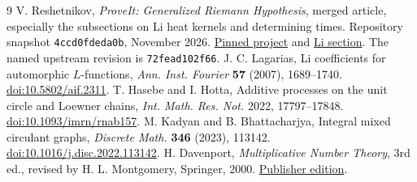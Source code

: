 \documentclass[11pt,letterpaper]{article}
\begin{document}
\begingroup\small
\begin{thebibliography}{9}
V. Reshetnikov, \emph{ProveIt: Generalized Riemann Hypothesis}, merged article, especially the subsections on Li heat kernels and determining times. Repository snapshot \texttt{4ccd0fdeda0b}, November 2026.
\href{https://github.com/VladimirReshetnikov/ProveIt/tree/4ccd0fdeda0b1cc316d2dfdccfdbcfea9d4b77fb/Analysis/GeneralizedRiemannHypothesis}{Pinned project} and
\href{https://github.com/VladimirReshetnikov/ProveIt/blob/4ccd0fdeda0b1cc316d2dfdccfdbcfea9d4b77fb/Analysis/GeneralizedRiemannHypothesis/Article/sections/li.tex}{Li section}.
The named upstream revision is \texttt{72fead102f66}.
J. C. Lagarias, Li coefficients for automorphic $L$-functions,
\emph{Ann. Inst. Fourier} \textbf{57} (2007), 1689--1740.
\href{https://doi.org/10.5802/aif.2311}{doi:10.5802/aif.2311}.
T. Hasebe and I. Hotta, Additive processes on the unit circle and Loewner chains,
\emph{Int. Math. Res. Not.} 2022, 17797--17848.
\href{https://doi.org/10.1093/imrn/rnab157}{doi:10.1093/imrn/rnab157}.
M. Kadyan and B. Bhattacharjya, Integral mixed circulant graphs,
\emph{Discrete Math.} \textbf{346} (2023), 113142.
\href{https://doi.org/10.1016/j.disc.2022.113142}{doi:10.1016/j.disc.2022.113142}.
H. Davenport, \emph{Multiplicative Number Theory}, 3rd ed.,
revised by H. L. Montgomery, Springer, 2000.
\href{https://link.springer.com/book/9780387950976}{Publisher edition}.
\end{thebibliography}
\endgroup
\end{document}
